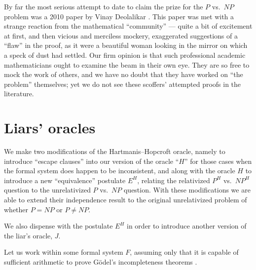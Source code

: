 \documentclass[letterpaper]{article}
\begin{document}
By far the most serious attempt to date to claim the prize for the $P$ vs.\ $NP$ problem was a 2010 paper by Vinay Deolalikar \cite{deolalikar2010}. This paper was met with a strange reaction from the mathematical ``community'' --- quite a bit of excitement at first, and then vicious and merciless mockery, exaggerated suggestions of a ``flaw'' in the proof, as it were a beautiful woman looking in the mirror on which a speck of dust had settled.  Our firm opinion is that such professional academic mathematicians ought to examine the beam in their own eye. They are so free to mock the work of others, and we have no doubt that they have worked on ``the problem'' themselves; yet we do not see these scoffers' attempted proofs in the literature.

\section{Liars' oracles}
We make two modifications of the Hartmanis--Hopcroft oracle, namely to introduce ``escape clauses'' into our version of the oracle ``$H$'' for those cases when the formal system does happen to be inconsistent, and along with the oracle $H$ to introduce a new ``equivalence'' postulate $E^H$, relating the relativized $P^H$ vs.\ $NP^H$ question to the unrelativized $P$ vs.\ $NP$ question.  With these modifications we are able to extend their independence result to the original unrelativized problem of whether $P=NP$ or $P\ne NP$.

We also dispense with the postulate $E^H$ in order to introduce another version of the liar's oracle, $J$.

Let us work within some formal system $F$, assuming only that it is capable of sufficient arithmetic to prove G{\"o}del's incompleteness theorems \cite{sep-goedel-incompleteness}.
\end{document}
